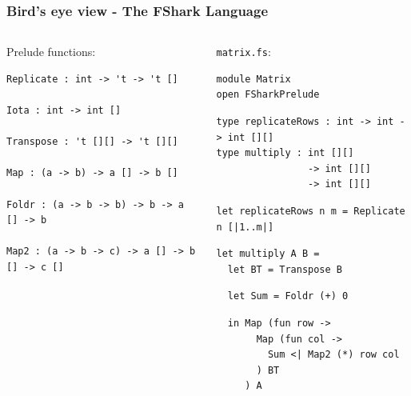 \documentclass[10pt, compress, usenames, dvipsnames]{beamer}
\begin{document}
\begin{frame}
  \frametitle{Bird's eye view - The FShark Language}
\begin{columns}[T] %
\begin{column}{.48\textwidth}
Prelude functions:\\
\begin{verbatim}
Replicate : int -> 't -> 't []

Iota : int -> int []

Transpose : 't [][] -> 't [][]

Map : (a -> b) -> a [] -> b []

Foldr : (a -> b -> b) -> b -> a [] -> b

Map2 : (a -> b -> c) -> a [] -> b [] -> c []
\end{verbatim}
\end{column}%
\hfill%
\pause
\begin{column}{.48\textwidth}
\texttt{matrix.fs}:
\begin{verbatim}
module Matrix
open FSharkPrelude
\end{verbatim}
\pause
\begin{verbatim}
type replicateRows : int -> int -> int [][] 
type multiply : int [][] 
                -> int [][] 
                -> int [][]
\end{verbatim}
\pause
\begin{verbatim}
let replicateRows n m = Replicate n [|1..m|]
\end{verbatim}
\pause
\begin{verbatim}
let multiply A B =
  let BT = Transpose B
\end{verbatim}
\pause
\begin{verbatim}
  let Sum = Foldr (+) 0
\end{verbatim}
\pause
\begin{verbatim}
  in Map (fun row ->
       Map (fun col -> 
         Sum <| Map2 (*) row col
       ) BT
     ) A
\end{verbatim}
\end{column}%
\end{columns}
\end{frame}
\end{document}
